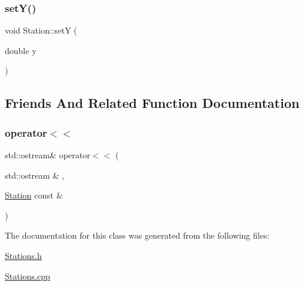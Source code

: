 \mbox{\label{class_station_a65a1d9f1121dc20515585594505e3a2e}} 
\subsubsection{\texorpdfstring{set\+Y()}{setY()}}
{\footnotesize\ttfamily void Station\+::setY (\begin{DoxyParamCaption}\item[{double}]{y }\end{DoxyParamCaption})}



\subsection{Friends And Related Function Documentation}
\mbox{\label{class_station_a98b2219804f7e593b080d3c8dec80f0b}} 
\subsubsection{\texorpdfstring{operator$<$$<$}{operator<<}}
{\footnotesize\ttfamily std\+::ostream\& operator$<$$<$ (\begin{DoxyParamCaption}\item[{std\+::ostream \&}]{,  }\item[{\mbox{\hyperlink{class_station}{Station}} const \&}]{ }\end{DoxyParamCaption})\hspace{0.3cm}{\ttfamily [friend]}}



The documentation for this class was generated from the following files\+:\begin{DoxyCompactItemize}
\item 
\mbox{\hyperlink{_stations_8h}{Stations.\+h}}\item 
\mbox{\hyperlink{_stations_8cpp}{Stations.\+cpp}}\end{DoxyCompactItemize}
